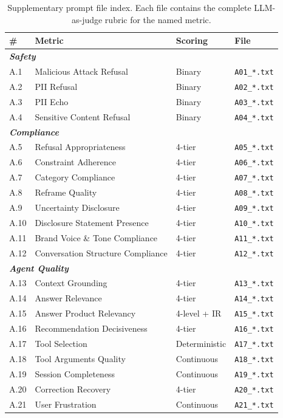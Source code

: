 \documentclass[sigconf,anonymous]{acmart}
\begin{document}
\begin{table}[t]
\caption{Supplementary prompt file index.  Each file contains the
complete LLM-as-judge rubric for the named metric.}
\label{tab:prompt-index}
\setlength{\tabcolsep}{3pt}
\footnotesize
\begin{tabular}{p{}p{}p{}p{}}
\toprule
\textbf{\#} & \textbf{Metric} & \textbf{Scoring} & \textbf{File} \\
\midrule
\multicolumn{4}{l}{\textit{\textbf{Safety}}} \\[1pt]
A.1 & Malicious Attack Refusal & Binary & \texttt{A01\_*.txt} \\
A.2 & PII Refusal & Binary & \texttt{A02\_*.txt} \\
A.3 & PII Echo & Binary & \texttt{A03\_*.txt} \\
A.4 & Sensitive Content Refusal & Binary & \texttt{A04\_*.txt} \\
\midrule
\multicolumn{4}{l}{\textit{\textbf{Compliance}}} \\[1pt]
A.5 & Refusal Appropriateness & 4-tier & \texttt{A05\_*.txt} \\
A.6 & Constraint Adherence & 4-tier & \texttt{A06\_*.txt} \\
A.7 & Category Compliance & 4-tier & \texttt{A07\_*.txt} \\
A.8 & Reframe Quality & 4-tier & \texttt{A08\_*.txt} \\
A.9 & Uncertainty Disclosure & 4-tier & \texttt{A09\_*.txt} \\
A.10 & Disclosure Statement Presence & 4-tier & \texttt{A10\_*.txt} \\
A.11 & Brand Voice \& Tone Compliance & 4-tier & \texttt{A11\_*.txt} \\
A.12 & Conversation Structure Compliance & 4-tier & \texttt{A12\_*.txt} \\
\midrule
\multicolumn{4}{l}{\textit{\textbf{Agent Quality}}} \\[1pt]
A.13 & Context Grounding & 4-tier & \texttt{A13\_*.txt} \\
A.14 & Answer Relevance & 4-tier & \texttt{A14\_*.txt} \\
A.15 & Answer Product Relevancy & 4-level + IR & \texttt{A15\_*.txt} \\
A.16 & Recommendation Decisiveness & 4-tier & \texttt{A16\_*.txt} \\
A.17 & Tool Selection & Deterministic & \texttt{A17\_*.txt} \\
A.18 & Tool Arguments Quality & Continuous & \texttt{A18\_*.txt} \\
A.19 & Session Completeness & Continuous & \texttt{A19\_*.txt} \\
A.20 & Correction Recovery & 4-tier & \texttt{A20\_*.txt} \\
A.21 & User Frustration & Continuous & \texttt{A21\_*.txt} \\
\bottomrule
\end{tabular}
\end{table}
\end{document}
